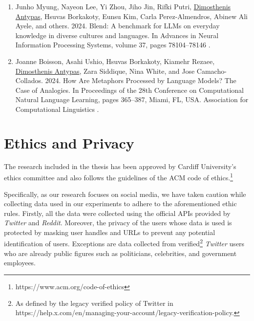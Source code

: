 \begin{enumerate}[start=16]
    \item \label{publication:16} Junho Myung, Nayeon Lee, Yi Zhou, Jiho Jin, Rifki Putri, \underline{Dimosthenis Antypas}, Hsuvas Borkakoty, Eunsu Kim, Carla Perez-Almendros, Abinew Ali Ayele, and others. 2024. Blend: A benchmark for LLMs on everyday knowledge in diverse cultures and languages. In Advances in Neural Information Processing Systems, volume 37, pages 78104–78146 \cite{myung2024blend}.

    \item \label{publication:17} Joanne Boisson, Asahi Ushio, Hsuvas Borkakoty, Kiamehr Rezaee, \underline{Dimosthenis Antypas}, Zara Siddique, Nina White, and Jose Camacho-Collados. 2024. How Are Metaphors Processed by Language Models? The Case of Analogies. In Proceedings of the 28th Conference on Computational Natural Language Learning, pages 365–387, Miami, FL, USA. Association for Computational Linguistics \cite{boisson-etal-2024-metaphors}.
\end{enumerate}


\section{Ethics and Privacy}

The research included in the thesis has been approved by Cardiff University's ethics committee and also follows the guidelines of the ACM code of ethics.\footnote{https://www.acm.org/code-of-ethics}

Specifically, as our research focuses on social media, we have taken caution while collecting data used in our experiments to adhere to the aforementioned ethic rules. Firstly, all the data were collected using the official \acp{API} provided by \textit{Twitter} and \textit{Reddit}. Moreover, the privacy of the users whose data is used is protected by masking user handles and \acp{URL} to prevent any potential identification of users. Exceptions are data collected from  verified\footnote{As defined by the legacy verified policy of Twitter in https://help.x.com/en/managing-your-account/legacy-verification-policy.} \textit{Twitter} users who are already public figures such as politicians, celebrities, and government employees.


